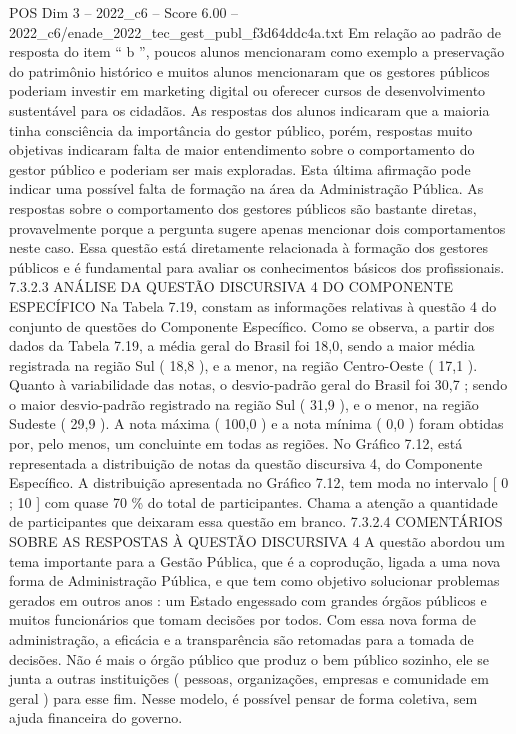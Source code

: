 \begin{textsample}{POS Dim 3 – 2022\_c6 – Score 6.00 – 2022\_c6/enade\_2022\_tec\_gest\_publ\_f3d64ddc4a.txt}
Em relação ao padrão de resposta do item “ b ”, poucos alunos mencionaram como exemplo a preservação do patrimônio histórico e muitos alunos mencionaram que os gestores públicos poderiam investir em marketing digital ou oferecer cursos de desenvolvimento sustentável para os cidadãos.
As respostas dos alunos indicaram que a maioria tinha consciência da importância do gestor público, porém, respostas muito objetivas indicaram falta de maior entendimento sobre o comportamento do gestor público e poderiam ser mais exploradas.
Esta última afirmação pode indicar uma possível falta de formação na área da Administração Pública.
As respostas sobre o comportamento dos gestores públicos são bastante diretas, provavelmente porque a pergunta sugere apenas mencionar dois comportamentos neste caso.
Essa questão está diretamente relacionada à formação dos gestores públicos e é fundamental para avaliar os conhecimentos básicos dos profissionais. 7.3.2.3 ANÁLISE DA QUESTÃO DISCURSIVA 4 DO COMPONENTE ESPECÍFICO Na Tabela 7.19, constam as informações relativas à questão 4 do conjunto de questões do Componente Específico.
Como se observa, a partir dos dados da Tabela 7.19, a média geral do Brasil foi 18,0, sendo a maior média registrada na região Sul ( 18,8 ), e a menor, na região Centro-Oeste ( 17,1 ).
Quanto à variabilidade das notas, o desvio-padrão geral do Brasil foi 30,7 ; sendo o maior desvio-padrão registrado na região Sul ( 31,9 ), e o menor, na região Sudeste ( 29,9 ).
A nota máxima ( 100,0 ) e a nota mínima ( 0,0 ) foram obtidas por, pelo menos, um concluinte em todas as regiões.
No Gráfico 7.12, está representada a distribuição de notas da questão discursiva 4, do Componente Específico.
A distribuição apresentada no Gráfico 7.12, tem moda no intervalo [ 0 ; 10 ] com quase 70 \% do total de participantes.
Chama a atenção a quantidade de participantes que deixaram essa questão em branco. 7.3.2.4 COMENTÁRIOS SOBRE AS RESPOSTAS À QUESTÃO DISCURSIVA 4 A questão abordou um tema importante para a Gestão Pública, que é a coprodução, ligada a uma nova forma de Administração Pública, e que tem como objetivo solucionar problemas gerados em outros anos : um Estado engessado com grandes órgãos públicos e muitos funcionários que tomam decisões por todos.
Com essa nova forma de administração, a eficácia e a transparência são retomadas para a tomada de decisões.
Não é mais o órgão público que produz o bem público sozinho, ele se junta a outras instituições ( pessoas, organizações, empresas e comunidade em geral ) para esse fim.
Nesse modelo, é possível pensar de forma coletiva, sem ajuda financeira do governo.

\end{textsample}
